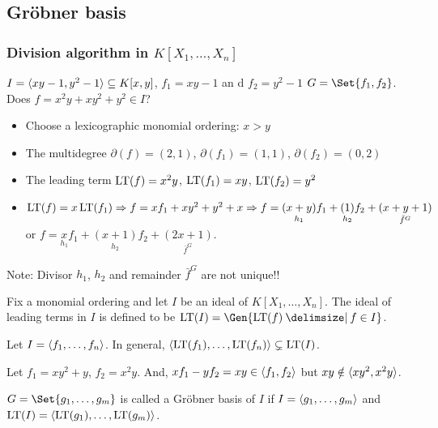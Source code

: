 \subsection{Gr\"{o}bner basis}

\subsubsection{Division algorithm in $K[X_1,\dots,X_n]$}

\begin{example}
  $I = \langle xy-1,y^2-1 \rangle \subseteq K[x,y]$, $f_1 = xy-1$ an
  d $f_2 = y^2-1$ $G=\Set{f_1,f_2}$. Does $f = x^2y+xy^2+y^2 \in I$?
  \begin{itemize}
      \item Choose a lexicographic monomial ordering: $x > y$
      \item The multidegree $\partial(f) = (2,1)$, $\partial(f_1) = (1,1)$,
        $\partial(f_2) = (0,2)$
      \item The leading term $\operatorname{LT}(f) = x^2y$, $\operatorname{LT}(f_1) = xy$, $\operatorname{LT}(f_2) = y^2$
      \item $\operatorname{LT}(f) = x\operatorname{LT}(f_1) \Rightarrow f = xf_1+xy^2+y^2+x \Rightarrow f = \underset{h_1}{(x+y)}f_1+\underset{h_2}{(1)}f_2+\underset{\bar{f}^G}{(x+y+1)}$ or $f = \underset{h_1}{x}f_1+\underset{h_2}{(x+1)}f_2+\underset{\bar{f}^G}{(2x+1)}$.
  \end{itemize}
  Note:  Divisor $h_1$, $h_2$ and remainder $\bar{f}^G$ are not unique!! 
\end{example}

\begin{definition}
  Fix a monomial ordering and let $I$ be an ideal of $K[X_1,\dots,X_n]$.
  The ideal of leading terms in $I$ is defined to be
  $\LT(I) = \Gen{ \LT(f) \given f\in I }$.
\end{definition}

\begin{remark}
  Let $I = \langle f_1,\dots,f_n \rangle$. In general, $\langle\operatorname{LT}(f_1),\dots,\operatorname{LT}(f_n)\rangle
  \subsetneq \operatorname{LT}(I)$.
\end{remark}

\begin{example}
  Let $f_1=xy^2+y$, $f_2=x^2y$. And, $xf_1-yf_2=xy \in \langle f_1,f_2 \rangle$ but
  $xy \notin \langle xy^2, x^2y \rangle$.
\end{example}

\begin{definition}
  $G = \Set{g_1,\dots,g_m}$ is called a Gr\"{o}bner basis of $I$ if
  $I = \langle g_1,\dots,g_m \rangle$ and $\operatorname{LT}(I) = \langle \operatorname{LT}(g_1),\dots,\operatorname{LT}(g_m) \rangle$.
\end{definition}

